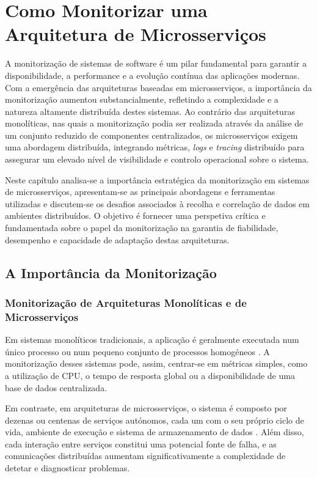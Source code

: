 \chapter{Como Monitorizar uma Arquitetura de Microsserviços }

A monitorização de sistemas de software é um pilar fundamental para garantir a disponibilidade, a performance e a evolução contínua das aplicações modernas. Com a emergência das arquiteturas baseadas em microsserviços, a importância da monitorização aumentou substancialmente, refletindo a complexidade e a natureza altamente distribuída destes sistemas. Ao contrário das arquiteturas monolíticas, nas quais a monitorização podia ser realizada através da análise de um conjunto reduzido de componentes centralizados, os microsserviços exigem uma abordagem distribuída, integrando métricas, \textit{logs} e \textit{tracing} distribuído para assegurar um elevado nível de visibilidade e controlo operacional sobre o sistema.

Neste capítulo analisa-se a importância estratégica da monitorização em sistemas de microsserviços, apresentam-se as principais abordagens e ferramentas utilizadas e discutem-se os desafios associados à recolha e correlação de dados em ambientes distribuídos. O objetivo é fornecer uma perspetiva crítica e fundamentada sobre o papel da monitorização na garantia de fiabilidade, desempenho e capacidade de adaptação destas arquiteturas.


\section{A Importância da Monitorização}

\subsection{Monitorização de Arquiteturas Monolíticas e de Microsserviços}

Em sistemas monolíticos tradicionais, a aplicação é geralmente executada num único processo ou num pequeno conjunto de processos homogéneos \cite{Villamizar2015}. A monitorização desses sistemas pode, assim, centrar-se em métricas simples, como a utilização de CPU, o tempo de resposta global ou a disponibilidade de uma base de dados centralizada. 

Em contraste, em arquiteturas de microsserviços, o sistema é composto por dezenas ou centenas de serviços autónomos, cada um com o seu próprio ciclo de vida, ambiente de execução e sistema de armazenamento de dados \cite{Newman2015}. Além disso, cada interação entre serviços constitui uma potencial fonte de falha, e as comunicações distribuídas aumentam significativamente a complexidade de detetar e diagnosticar problemas. 

